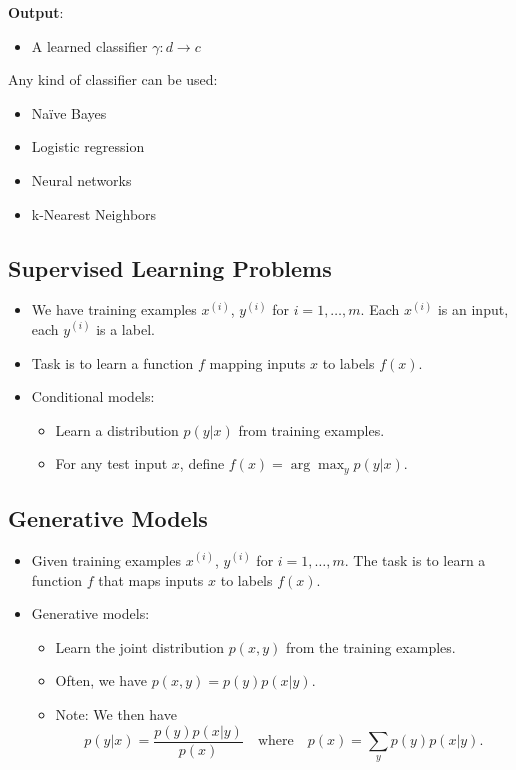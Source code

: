     \textbf{Output}:
    \begin{itemize}
        \item A learned classifier $\gamma: d \to c$
    \end{itemize}

    Any kind of classifier can be used:
    \begin{itemize}
        \item Naïve Bayes
        \item Logistic regression
        \item Neural networks
        \item k-Nearest Neighbors
    \end{itemize}

 \subsection{Supervised Learning Problems}
  \begin{itemize}
    \item We have training examples $x^{(i)}$, $y^{(i)}$ for $i = 1, \ldots, m$. Each $x^{(i)}$ is an input, each $y^{(i)}$ is a label.
    \item Task is to learn a function $f$ mapping inputs $x$ to labels $f(x)$.
    \item Conditional models:
    \begin{itemize}
      \item Learn a distribution $p(y|x)$ from training examples.
      \item For any test input $x$, define $f(x) = \arg \max_y p(y|x)$.
    \end{itemize}
  \end{itemize}

  \subsection{Generative Models}
  \begin{itemize}
    \item Given training examples $x^{(i)}$, $y^{(i)}$ for $i = 1, \ldots, m$. The task is to learn a function $f$ that maps inputs $x$ to labels $f(x)$.
    \item Generative models:
    \begin{itemize}
      \item Learn the joint distribution $p(x, y)$ from the training examples.
      \item Often, we have $p(x, y) = p(y)p(x|y)$.
      \item Note: We then have
      \[
        p(y|x) = \frac{p(y)p(x|y)}{p(x)} \quad \text{where} \quad p(x) = \sum_y p(y)p(x|y).
      \]
    \end{itemize}
  \end{itemize}


